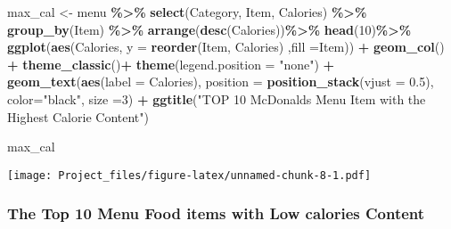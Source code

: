 \documentclass[
]{article}
\newenvironment{Shaded}{\begin{snugshade}}{\end{snugshade}}
\newcommand{\AttributeTok}[1]{\textcolor[rgb]{0.13,0.29,0.53}{#1}}
\newcommand{\DecValTok}[1]{\textcolor[rgb]{0.00,0.00,0.81}{#1}}
\newcommand{\FloatTok}[1]{\textcolor[rgb]{0.00,0.00,0.81}{#1}}
\newcommand{\FunctionTok}[1]{\textcolor[rgb]{0.13,0.29,0.53}{\textbf{#1}}}
\newcommand{\NormalTok}[1]{#1}
\newcommand{\OtherTok}[1]{\textcolor[rgb]{0.56,0.35,0.01}{#1}}
\newcommand{\SpecialCharTok}[1]{\textcolor[rgb]{0.81,0.36,0.00}{\textbf{#1}}}
\newcommand{\StringTok}[1]{\textcolor[rgb]{0.31,0.60,0.02}{#1}}
\begin{document}
\begin{Shaded}
\begin{Highlighting}[]
\NormalTok{max\_cal }\OtherTok{\textless{}{-}}\NormalTok{ menu }\SpecialCharTok{\%\textgreater{}\%} 
  \FunctionTok{select}\NormalTok{(Category,}
\NormalTok{         Item,}
\NormalTok{         Calories) }\SpecialCharTok{\%\textgreater{}\%} 
  \FunctionTok{group\_by}\NormalTok{(Item) }\SpecialCharTok{\%\textgreater{}\%} 
  \FunctionTok{arrange}\NormalTok{(}\FunctionTok{desc}\NormalTok{(Calories))}\SpecialCharTok{\%\textgreater{}\%} 
  \FunctionTok{head}\NormalTok{(}\DecValTok{10}\NormalTok{)}\SpecialCharTok{\%\textgreater{}\%} 
  \FunctionTok{ggplot}\NormalTok{(}\FunctionTok{aes}\NormalTok{(Calories,}
             \AttributeTok{y =} \FunctionTok{reorder}\NormalTok{(Item,}
\NormalTok{                         Calories)}
\NormalTok{             ,}\AttributeTok{fill =}\NormalTok{Item)) }\SpecialCharTok{+} 
  \FunctionTok{geom\_col}\NormalTok{() }\SpecialCharTok{+}
  \FunctionTok{theme\_classic}\NormalTok{()}\SpecialCharTok{+}
  \FunctionTok{theme}\NormalTok{(}\AttributeTok{legend.position =} \StringTok{"none"}\NormalTok{) }\SpecialCharTok{+} 
  \FunctionTok{geom\_text}\NormalTok{(}\FunctionTok{aes}\NormalTok{(}\AttributeTok{label =}\NormalTok{ Calories), }
            \AttributeTok{position =} \FunctionTok{position\_stack}\NormalTok{(}\AttributeTok{vjust =} \FloatTok{0.5}\NormalTok{),}
            \AttributeTok{color=}\StringTok{"black"}\NormalTok{, }\AttributeTok{size =}\DecValTok{3}\NormalTok{) }\SpecialCharTok{+} \FunctionTok{ggtitle}\NormalTok{(}\StringTok{"TOP 10 McDonald\textquotesingle{}s Menu Item with the Highest Calorie Content"}\NormalTok{)}

\NormalTok{max\_cal}
\end{Highlighting}
\end{Shaded}

\texttt{[image: Project\_files/figure-latex/unnamed-chunk-8-1.pdf]}

\hypertarget{the-top-10-menu-food-items-with-low-calories-content}{%
\subsubsection{The Top 10 Menu Food items with Low calories
Content}\label{the-top-10-menu-food-items-with-low-calories-content}}
\end{document}
